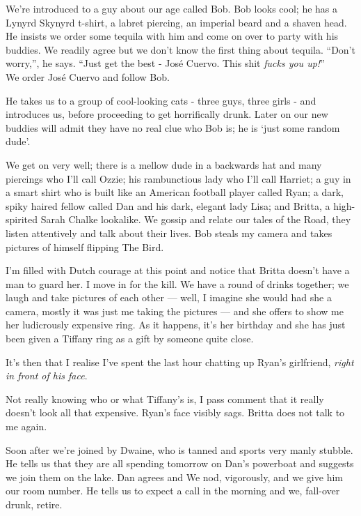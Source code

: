 \documentclass[a5paper,titlepage,draft]{book}
\begin{document}
We're introduced to a guy about our age called Bob.  Bob looks cool; he has a Lynyrd Skynyrd t-shirt, a labret piercing, an imperial beard and a shaven head.  He insists we order some tequila with him and come on over to party with his buddies.  We readily agree but we don't know the first thing about tequila.  ``Don't worry,'', he says.  ``Just get the best - Jos\'{e} Cuervo.  This shit \emph{fucks you up!}'' \\
We order Jos\'{e} Cuervo and follow Bob.


He takes us to a group of cool-looking cats - three guys, three girls - and introduces us, before proceeding to get horrifically drunk.  Later on our new buddies will admit they have no real clue who Bob is; he is `just some random dude'.

We get on very well; there is a mellow dude in a backwards hat and many piercings who I'll call Ozzie; his rambunctious lady who I'll call Harriet; a guy in a smart shirt who is built like an American football player called Ryan; a dark, spiky haired fellow called Dan and his dark, elegant lady Lisa; and Britta, a high-spirited Sarah Chalke lookalike.  We gossip and relate our tales of the Road, they listen attentively and talk about their lives.  Bob steals my camera and takes pictures of himself flipping The Bird.

I'm filled with Dutch courage at this point and notice that Britta doesn't have a man to guard her.  I move in for the kill.  We have a round of drinks together; we laugh and take pictures of each other --- well, I imagine she would had she a camera, mostly it was just me taking the pictures --- and she offers to show me her ludicrously expensive ring.  As it happens, it's her birthday and she has just been given a Tiffany ring as a gift by someone quite close.

It's then that I realise I've spent the last hour chatting up Ryan's girlfriend, \emph{right in front of his face}.

Not really knowing who or what Tiffany's is, I pass comment that it really doesn't look all that expensive.  Ryan's face visibly sags.  Britta does not talk to me again.

Soon after we're joined by Dwaine, who is tanned and sports very manly stubble.  He tells us that they are all spending tomorrow on Dan's powerboat and suggests we join them on the lake.  Dan agrees and We nod, vigorously, and we give him our room number.  He tells us to expect a call in the morning and we, fall-over drunk, retire.
\end{document}
